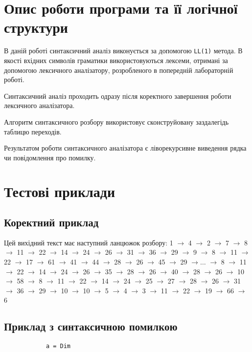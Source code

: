 \documentclass[a4paper,12pt,notitlepage,pdftex]{scrreprt}
\begin{document}
\chapter{Опис роботи програми та її логічної структури}
\label{chap:third}
    В даній роботі синтаксичний аналіз виконується за допомогою \texttt{LL(1)} метода.
    В якості вхідних символів граматики використовуються лексеми, отримані за допомогою лексичного аналізатору,
    розробленого в попередній лабораторній роботі.

    Синтаксичний аналіз проходить одразу після коректного завершення роботи лексичного аналізатора.

    Алгоритм синтаксичного розбору використовує сконструйовану заздалегідь таблицю переходів.

    Результатом роботи синтаксичного аналізатора є ліворекурсивне виведення рядка чи повідомлення про помилку.
\chapter{Тестові приклади}
\label{chap:fourth}
    \section{Коректний приклад}
    \label{sec:ex1}
        
        Цей вихідний текст має наступний ланцюжок розбору:
        1 $\rightarrow$ 4 $\rightarrow$ 2 $\rightarrow$ 7 $\rightarrow$ 8 $\rightarrow$ 11 $\rightarrow$ 22
          $\rightarrow$ 14 $\rightarrow$ 24 $\rightarrow$ 26 $\rightarrow$ 31 $\rightarrow$ 36 $\rightarrow$ 29
          $\rightarrow$ 9 $\rightarrow$ 8 $\rightarrow$ 11 $\rightarrow$ 22 $\rightarrow$ 17 $\rightarrow$ 61
          $\rightarrow$ 41 $\rightarrow$ 44 $\rightarrow$ 28 $\rightarrow$ 26 $\rightarrow$ 45 $\rightarrow$ 29
          $\rightarrow \dots$
          $\rightarrow$ 8 $\rightarrow$ 11 $\rightarrow$ 22 $\rightarrow$ 14 $\rightarrow$ 24 $\rightarrow$ 26
          $\rightarrow$ 35 $\rightarrow$ 28 $\rightarrow$ 26 $\rightarrow$ 40 $\rightarrow$ 28 $\rightarrow$ 26
          $\rightarrow$ 10 $\rightarrow$ 58 $\rightarrow$ 8 $\rightarrow$ 11 $\rightarrow$ 22 $\rightarrow$ 14
          $\rightarrow$ 24 $\rightarrow$ 25 $\rightarrow$ 27 $\rightarrow$ 28 $\rightarrow$ 26 $\rightarrow$ 31
          $\rightarrow$ 36 $\rightarrow$ 29 $\rightarrow$ 10 $\rightarrow$ 10 $\rightarrow$ 5 $\rightarrow$ 4
          $\rightarrow$ 3 $\rightarrow$ 11 $\rightarrow$ 22 $\rightarrow$ 19 $\rightarrow$ 66 $\rightarrow$ 6
    \section{Приклад з синтаксичною помилкою}
    \label{sec:ex2}
        \begin{lstlisting}
            a = Dim
        \end{lstlisting}
\end{document}
